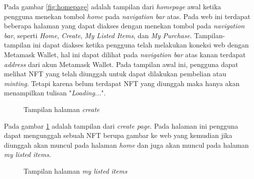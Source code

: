   Pada gambar \ref{fig:homepage} adalah tampilan dari \emph{homepage} awal ketika pengguna menekan tombol \emph{home} pada \emph{navigation bar} atas. Pada web ini terdapat beberapa halaman yang dapat diakses dengan menekan tombol pada \emph{navigation bar}, seperti \emph{Home}, \emph{Create}, \emph{My Listed Items}, dan \emph{My Purchase}. Tampilan-tampilan ini dapat diakses ketika pengguna telah melakukan koneksi web dengan Metamask Wallet, hal ini dapat dilihat pada \emph{navigation bar} atas kanan terdapat \emph{address} dari akun Metamask Wallet. Pada tampilan awal ini, pengguna dapat melihat NFT yang telah diunggah untuk dapat dilakukan pembelian atau \emph{minting}. Tetapi karena belum terdapat NFT yang diunggah maka hanya akan menampilkan tulisan "\emph{Loading...}".
   
  \begin{figure} [H] \centering
    \caption{Tampilan halaman \emph{create}}
    \label{fig:createpage}
    \end{figure}

  Pada gambar \ref{fig:createpage} adalah tampilan dari \emph{create page}. Pada halaman ini pengguna dapat mengunggah sebuah NFT berupa gambar ke web yang kemudian jika diunggah akan muncul pada halaman \emph{home} dan juga akan muncul pada halaman \emph{my listed items}.

  \begin{figure} [H] \centering
    \caption{Tampilan halaman \emph{my listed items}}
    \label{fig:listingpage}
    \end{figure}
  
